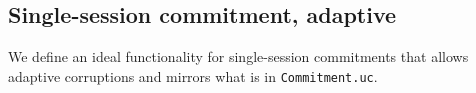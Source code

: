 \documentclass[11pt,letterpaper]{article}
\theoremstyle{plain} %
\theoremstyle{definition} %
\theoremstyle{remark} %
\newcommand{\File}[1]{\texttt{#1}}
\begin{document}
\subsection{Single-session commitment, adaptive}
\label{sec:ideal-func-com}

We define an ideal functionality for single-session commitments that allows adaptive corruptions and mirrors what is in \File{Commitment.uc}.
\newcommand{\EnvCommitReqMsg}{\mathsf{EnvCommitReq}}
\newcommand{\IFCommitReqMsg}{\mathsf{IFCommitReq}}
\newcommand{\SimCommCorruptionStatusMsg}{\mathsf{CommCorruptionStatus}}
\newcommand{\CommBitMsg}{\mathsf{CommBit}}
\newcommand{\CommCorruptedBit}{\mathsf{corrupted}}
\newcommand{\CommitReq}{\mathsf{CommitReq}}
\newcommand{\CommitOkMsg}{\mathsf{CommitOk}}
\newcommand{\OpenReq}{\mathsf{OpenReq}}
\newcommand{\OpenOkMsg}{\mathsf{OpenOk}}
\newcommand{\CorruptMsg}{\mathsf{Corrupt}}
\newcommand{\CorruptAckMsg}{\mathsf{CorruptAck}}
\newcommand{\CorruptStatusReqMsg}{\mathsf{CorruptStatus}}
\newcommand{\CorruptStatusRspMsg}{\mathsf{CorruptStatus}}
\end{document}
